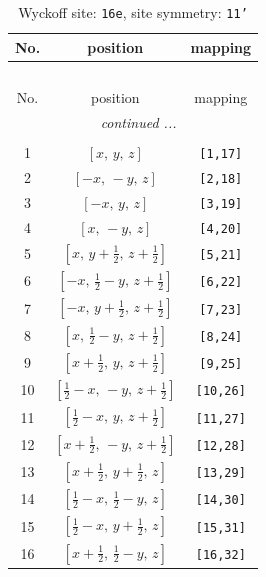 \documentclass[fleqn,8pt]{jsarticle}
\begin{document}
\begin{longtable}{ccc}
\caption{Wyckoff site: {\tt 16e}, site symmetry: {\tt 11'}}
 \\
 \hline \hline
No. & position & mapping \\ \hline \endfirsthead

\multicolumn{2}{l}{\tablename\ \thetable{}} \\
 \hline \hline
No. & position & mapping \\ \hline \endhead

 \hline \hline
\multicolumn{2}{r}{\footnotesize\it continued ...} \\ \endfoot

 \hline \hline
\multicolumn{2}{r}{} \\ \endlastfoot

1 & $\left[ x,\, y,\, z \right]$ & {\tt [1,17]} \\ \hline
2 & $\left[ - x,\, - y,\, z \right]$ & {\tt [2,18]} \\ \hline
3 & $\left[ - x,\, y,\, z \right]$ & {\tt [3,19]} \\ \hline
4 & $\left[ x,\, - y,\, z \right]$ & {\tt [4,20]} \\ \hline
5 & $\left[ x,\, y + \frac{1}{2},\, z + \frac{1}{2} \right]$ & {\tt [5,21]} \\ \hline
6 & $\left[ - x,\, \frac{1}{2} - y,\, z + \frac{1}{2} \right]$ & {\tt [6,22]} \\ \hline
7 & $\left[ - x,\, y + \frac{1}{2},\, z + \frac{1}{2} \right]$ & {\tt [7,23]} \\ \hline
8 & $\left[ x,\, \frac{1}{2} - y,\, z + \frac{1}{2} \right]$ & {\tt [8,24]} \\ \hline
9 & $\left[ x + \frac{1}{2},\, y,\, z + \frac{1}{2} \right]$ & {\tt [9,25]} \\ \hline
10 & $\left[ \frac{1}{2} - x,\, - y,\, z + \frac{1}{2} \right]$ & {\tt [10,26]} \\ \hline
11 & $\left[ \frac{1}{2} - x,\, y,\, z + \frac{1}{2} \right]$ & {\tt [11,27]} \\ \hline
12 & $\left[ x + \frac{1}{2},\, - y,\, z + \frac{1}{2} \right]$ & {\tt [12,28]} \\ \hline
13 & $\left[ x + \frac{1}{2},\, y + \frac{1}{2},\, z \right]$ & {\tt [13,29]} \\ \hline
14 & $\left[ \frac{1}{2} - x,\, \frac{1}{2} - y,\, z \right]$ & {\tt [14,30]} \\ \hline
15 & $\left[ \frac{1}{2} - x,\, y + \frac{1}{2},\, z \right]$ & {\tt [15,31]} \\ \hline
16 & $\left[ x + \frac{1}{2},\, \frac{1}{2} - y,\, z \right]$ & {\tt [16,32]} \\
\end{longtable}
\end{document}
